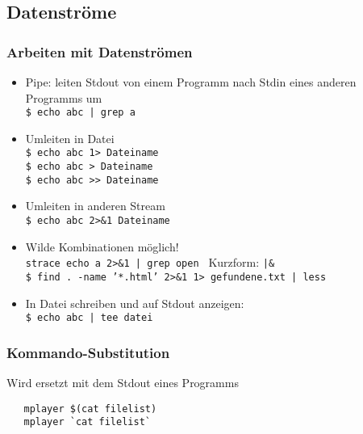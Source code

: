 \documentclass{beamer}
\begin{document}
\subsection{Datenströme}
\begin{frame}
\frametitle{Arbeiten mit Datenströmen}
 \begin{itemize}
  \item Pipe: leiten Stdout von einem Programm nach Stdin eines anderen Programms um\\
   {\tt \$ echo abc | grep a}
  \item Umleiten in Datei\\
   {\tt \$ echo abc 1> Dateiname}\\
   {\tt \$ echo abc > Dateiname}\\
   {\tt \$ echo abc >> Dateiname}
  \item Umleiten in anderen Stream\\
   {\tt \$ echo abc 2>\&1 Dateiname}
  \item Wilde Kombinationen möglich!\\
   {\tt strace echo a 2>\&1 | grep open } Kurzform: {\tt |\&} \\
   {\tt \$ find . -name '*.html' 2>\&1 1> gefundene.txt | less }
  \item In Datei schreiben und auf Stdout anzeigen: \\
   {\tt \$ echo abc | tee datei }
 \end{itemize}
\end{frame}

\begin{frame}[fragile]
 \frametitle{Kommando-Substitution}
 Wird ersetzt mit dem Stdout eines Programms
 \begin{lstlisting}
   mplayer $(cat filelist)
   mplayer `cat filelist`
 \end{lstlisting}
\end{frame}
\end{document}
